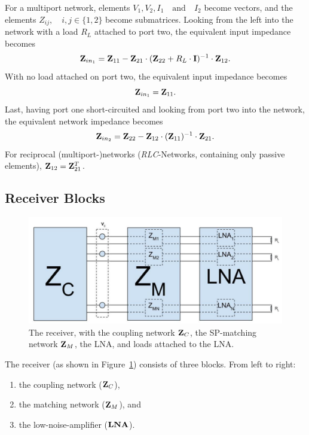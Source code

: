 For a multiport network, elements $V_1,V_2,I_1\quad\text{and}\quad I_2$ become vectors, and the elements $Z_{ij},\quad i,j\in\{1,2\}$ become submatrices.
Looking from the left into the network with a load $R_L$ attached to port two, the equivalent input impedance becomes
\begin{equation}
\label{eq:eq_imp_load}
\mathbf{Z}_{in_1} = \mathbf{Z}_{11} - \mathbf{Z}_{21}\cdot(\mathbf{Z}_{22} + R_L\cdot\mathbf{I})^{-1}\cdot \mathbf{Z}_{12}.
\end{equation}
With no load attached on port two, the equivalent input impedance becomes
\begin{equation}
\label{eq:eq_imp_oc}
\mathbf{Z}_{in_1} = \mathbf{Z}_{11}.
\end{equation}
Last, having port one short-circuited and looking from port two into the network, the equivalent network impedance becomes
\begin{equation}
\label{eq:eq_imp_sc}
\mathbf{Z}_{in_2} = \mathbf{Z}_{22} - \mathbf{Z}_{12}\cdot(\mathbf{Z}_{11})^{-1}\cdot \mathbf{Z}_{21}.
\end{equation}
For reciprocal (multiport-)networks (\textit{RLC}-Networks, containing only passive elements), $\mathbf{Z}_{12} = \mathbf{Z}_{21}^T$.

\subsection{Receiver Blocks}
\begin{figure}[h]
\centering
  \includegraphics[width=\linewidth]{images/Receiver.jpg}
\caption{The receiver, with the coupling network $\mathbf{Z}_C$, the SP-matching network $\mathbf{Z}_M$, the LNA, and loads attached to the LNA.}
\label{fig:receiver}
\end{figure}
The receiver (as shown in Figure~\ref{fig:receiver}) consists of three blocks.
From left to right:
\begin{enumerate}
\item{the coupling network ($\mathbf{Z}_C$),}
\item{the matching network ($\mathbf{Z}_M$), and}
\item{the low-noise-amplifier ($\mathbf{LNA}$).}
\end{enumerate}
 
